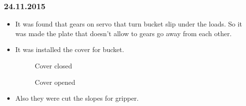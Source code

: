 \subsubsection{24.11.2015}
\begin{itemize}
\item It was found that gears on servo that turn bucket slip under the loads. So it was made the plate that doesn't allow to gears go away from each other. 
\item It was installed the cover for bucket.
\begin{figure}[H]
	\begin{minipage}[h]{1\linewidth}
		\caption{Cover closed}
	\end{minipage}
\end{figure} 
\begin{figure}[H]
	\begin{minipage}[h]{1\linewidth}
		\caption{Cover opened}
	\end{minipage}
\end{figure} 
\item Also they were cut the slopes for gripper.
\end{itemize}
